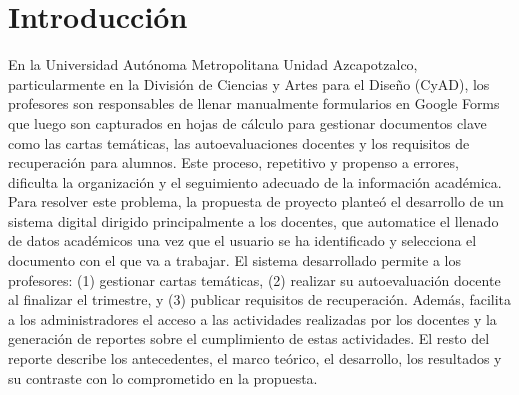 \section{Introducción}
\justifying

En la Universidad Autónoma Metropolitana Unidad Azcapotzalco, particularmente en la División de Ciencias y Artes para el Diseño (CyAD), los profesores son responsables de llenar manualmente formularios en Google Forms que luego son capturados en hojas de cálculo para gestionar documentos clave como las cartas temáticas, las autoevaluaciones docentes y los requisitos de recuperación para alumnos. Este proceso, repetitivo y propenso a errores, dificulta la organización y el seguimiento adecuado de la información académica.
Para resolver este problema, la propuesta de proyecto planteó el desarrollo de un sistema digital dirigido principalmente a los docentes, que automatice el llenado de datos académicos una vez que el usuario se ha identificado y selecciona el documento con el que va a trabajar. El sistema desarrollado permite a los profesores: (1) gestionar cartas temáticas, (2) realizar su autoevaluación docente al finalizar el trimestre, y (3) publicar requisitos de recuperación. Además, facilita a los administradores el acceso a las actividades realizadas por los docentes y la generación de reportes sobre el cumplimiento de estas actividades. El resto del reporte describe los antecedentes, el marco teórico, el desarrollo, los resultados y su contraste con lo comprometido en la propuesta. 

\newpage
